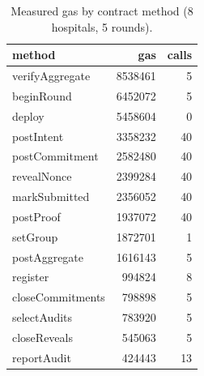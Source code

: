 \begin{table}
\caption{Measured gas by contract method (8 hospitals, 5 rounds).}
\label{tab:T17_gas_breakdown}
\begin{tabular}{lrr}
\toprule
method & gas & calls \\
\midrule
verifyAggregate & 8538461 & 5 \\
beginRound & 6452072 & 5 \\
deploy & 5458604 & 0 \\
postIntent & 3358232 & 40 \\
postCommitment & 2582480 & 40 \\
revealNonce & 2399284 & 40 \\
markSubmitted & 2356052 & 40 \\
postProof & 1937072 & 40 \\
setGroup & 1872701 & 1 \\
postAggregate & 1616143 & 5 \\
register & 994824 & 8 \\
closeCommitments & 798898 & 5 \\
selectAudits & 783920 & 5 \\
closeReveals & 545063 & 5 \\
reportAudit & 424443 & 13 \\
\bottomrule
\end{tabular}
\end{table}
